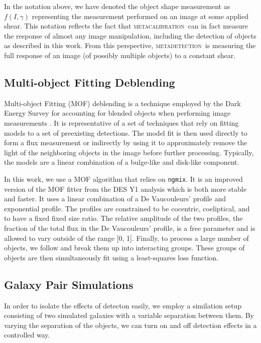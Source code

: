 \documentclass[fleqn,useAMS,usenatbib]{mnras}
\newcommand{\ngmix}{\texttt{ngmix}}
\newcommand{\mcal}{\textsc{metacalibration}}
\newcommand{\mdet}{\textsc{metadetection}}
\begin{document}
In the notation above, we have denoted the object shape measurement as
$f(I, \gamma)$ representing the measurement performed on an image at some applied
shear. This notation reflects the fact that \mcal\ can in fact measure the response
of almost any image manipulation, including the detection of objects as described
in this work. From this perspective, \mdet\ is measuring the full response of
an image (of possibly multiple objects) to a constant shear.

\subsection{Multi-object Fitting Deblending}

Multi-object Fitting (MOF) deblending is a technique employed by the Dark
Energy Survey for accounting for blended objects when performing image
measurements \citep{DESY1cat}. It is representative of a set of techniques that
rely on fitting models to a set of preexisting detections. The model fit is
then used directly to form a flux measurement or indirectly by using it to
approximately remove the light of the neighboring objects in the image
before further processing. Typically, the models are a linear combination
of a bulge-like and disk-like component.

In this work, we use a MOF algorithm
that relies on \ngmix. It is an improved version of the MOF fitter from the
DES Y1 analysis which is both more stable and faster. It uses a linear combination
of a De Vaucouleurs' \citep{devauc1948} profile and exponential profile. The
profiles are constrained to be cocentric, coeliptical, and to have a fixed
fixed size ratio. The relative amplitude of the two profiles, the fraction of the
total flux in the De Vaucouleurs' profile, is a free parameter and is allowed
to vary outside of the range [0, 1]. Finally, to process a large number of
objects, we follow \citet{DESY1cat} and break them up into interacting groups.
These groups of objects are then simultaneously fit using a least-squares loss
function.

\subsection{Galaxy Pair Simulations}
\label{sec:sims:pairs}

In order to isolate the effects of detecton easily, we employ a similation setup
consisting of two simulated galaxies with a variable separation between them. By
varying the separation of the objects, we can turn on and off detection effects in
a controlled way.
\end{document}

